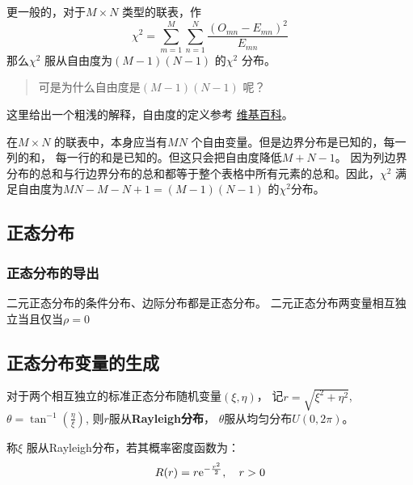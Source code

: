 更一般的，对于\(M \times N\) 类型的联表，作\[
    \chi^{2}= \sum_{m=1}^{M} \sum_{n=1}^{N} \frac{(O_{mn} -
    E_{mn})^{2}}{E_{mn}}
\]
那么\(\chi^{2}\) 服从自由度为\((M-1)(N-1)\) 的\(\chi^{2}\) 分布。

\begin{quote}
    可是为什么自由度是\((M-1)(N-1)\) 呢？
\end{quote}

这里给出一个粗浅的解释，自由度的定义参考
\href{https://en.wikipedia.org/wiki/Degrees_of_freedom_(statistics)#Example}{维基百科}。

在\(M \times N\) 的联表中，本身应当有\(MN\) 个自由变量。但是边界分布是已知的，每一列的和，
每一行的和是已知的。但这只会把自由度降低\(M+N-1\)。
因为列边界分布的总和与行边界分布的总和都等于整个表格中所有元素的总和。因此，\(\chi^{2}\)
满足自由度为\(MN-M-N+1 = (M-1)(N-1)\) 的\(\chi^{2}\)分布。


\subsection{正态分布}

\subsubsection{正态分布的导出}
二元正态分布的条件分布、边际分布都是正态分布。
二元正态分布两变量相互独立当且仅当\(\rho=0\)

\subsection{正态分布变量的生成}
\begin{claim}
    对于两个相互独立的标准正态分布随机变量\((\xi, \eta)\)，
    记\(r=\sqrt{\xi^{2}+\eta^{2}}\), \(\theta =
    \tan^{-1}\left( \frac{\eta}{\xi} \right)\),
    则\(r\)服从\textbf{Rayleigh分布}，
    \(\theta\)服从均匀分布\(U(0,2\pi)\)。
\end{claim}

\begin{definition}[Rayleigh分布]
    称\(\xi\) 服从Rayleigh分布，若其概率密度函数为：
    \[
        R(r) = r\mathrm{e}^{-\frac{r^{2}}{2}}, \quad r>0
    \]
\end{definition}

